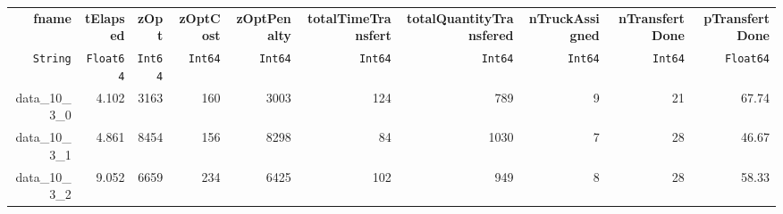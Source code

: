 \begin{tabular}{rrrrrrrrrr}
  \hline
  \textbf{fname} & \textbf{tElapsed} & \textbf{zOpt} & \textbf{zOptCost} & \textbf{zOptPenalty} & \textbf{totalTimeTransfert} & \textbf{totalQuantityTransfered} & \textbf{nTruckAssigned} & \textbf{nTransfertDone} & \textbf{pTransfertDone} \\
  \texttt{String} & \texttt{Float64} & \texttt{Int64} & \texttt{Int64} & \texttt{Int64} & \texttt{Int64} & \texttt{Int64} & \texttt{Int64} & \texttt{Int64} & \texttt{Float64} \\\hline
  data\_10\_3\_0 & 4.102 & 3163 & 160 & 3003 & 124 & 789 & 9 & 21 & 67.74 \\
  data\_10\_3\_1 & 4.861 & 8454 & 156 & 8298 & 84 & 1030 & 7 & 28 & 46.67 \\
  data\_10\_3\_2 & 9.052 & 6659 & 234 & 6425 & 102 & 949 & 8 & 28 & 58.33 \\\hline
\end{tabular}
